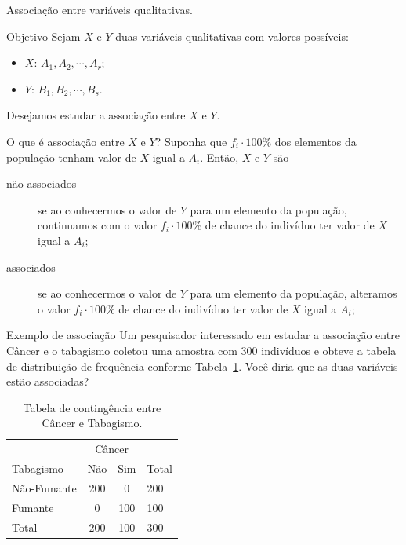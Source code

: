 \documentclass[9pt]{beamer}
\begin{document}
\begin{frame}{Associação entre variáveis qualitativas.}

\begin{block}{Objetivo}
	Sejam $X$ e $Y$ duas variáveis qualitativas com valores possíveis:
	\begin{itemize}
		\item $X$: $A_1, A_2, \cdots, A_r$;
		\item $Y$: $B_1, B_2, \cdots, B_s$.
	\end{itemize}
	Desejamos estudar a associação entre $X$ e $Y$.
\end{block}
\vfill

\begin{block}{O que é associação entre $X$ e $Y$?}
	Suponha que $f_i \cdot 100 \%$ dos elementos da população tenham valor de $X$ igual a $A_i$. Então, $X$ e $Y$ são
	\begin{description}
		\item[não associados] se ao conhecermos o valor de $Y$ para um elemento da população, {\color{red} continuamos} com o valor $f_i \cdot 100\%$ de chance do indivíduo ter valor de $X$ igual a $A_i$;
		\item[associados] se ao conhecermos o valor de $Y$ para um elemento da população, {\color{red} alteramos} o valor $f_i \cdot 100\%$ de chance do indivíduo ter valor de $X$ igual a $A_i$;
	\end{description}
	
\end{block}

\end{frame}

\begin{frame}{Exemplo de associação}
Um pesquisador interessado em estudar a associação entre Câncer e o tabagismo coletou uma amostra com 300 indivíduos e obteve a tabela de distribuição de frequência conforme Tabela~\ref{tab:associacao}. Você diria que as duas variáveis estão associadas?
\begin{table}[htbp]
	\centering
	\caption{Tabela de contingência entre Câncer e Tabagismo.}
	\label{tab:associacao}
	\begin{tabular}{l|cc|l}
		\toprule[0.05cm]
		& \multicolumn{2}{|c|}{Câncer} & \\ \cmidrule{2-3}
		Tabagismo & Não & Sim & Total\\ \midrule[0.05cm]
		Não-Fumante & 200 & 0 & 200 \\
		Fumante & 0 & 100 & 100\\ \midrule[0.05cm]
		Total & 200 & 100 & 300\\ \bottomrule[0.05cm]
	\end{tabular}
\end{table}
\end{frame}
\end{document}
